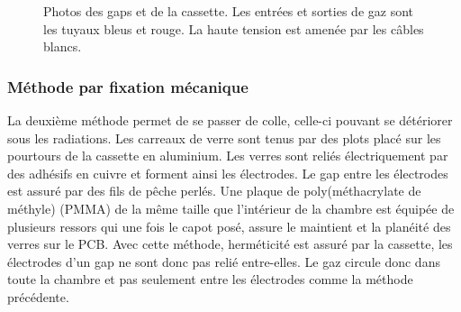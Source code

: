 \begin{figure}[ht!]
\begin{minipage}[t]{.45\textwidth}
    \end{minipage}
 	\caption{Photos des gaps et de la cassette. Les entrées et sorties de gaz sont les tuyaux bleus et rouge. La haute tension est amenée par les câbles blancs.}
 	\label{colle}
 \end{figure}
 
 \subsubsection{Méthode par fixation mécanique}
 La deuxième méthode permet de se passer de colle, celle-ci pouvant se détériorer sous les radiations. Les carreaux de verre sont tenus par des plots placé sur les pourtours de la cassette en aluminium. Les verres sont reliés électriquement par des adhésifs en cuivre et forment ainsi les électrodes. Le gap entre les électrodes est assuré par des fils de pêche perlés. Une plaque de poly(méthacrylate de méthyle) (PMMA) de la même taille que l'intérieur de la chambre est équipée de plusieurs ressors qui une fois le capot posé, assure le maintient et la planéité des verres sur le PCB.  Avec cette méthode, herméticité est assuré par la cassette, les électrodes d'un gap ne sont donc pas relié entre-elles. Le gaz circule donc dans toute la chambre et pas seulement entre les électrodes comme la méthode précédente.
 
